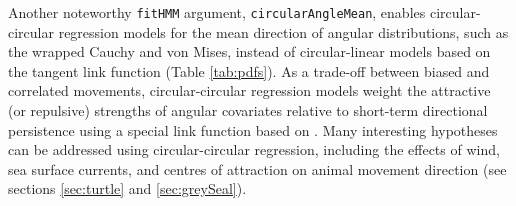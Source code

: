 \documentclass[12pt]{article}\usepackage[]{graphicx}\usepackage[]{color}
\begin{document}
Another noteworthy \verb|fitHMM| argument, \verb|circularAngleMean|, enables circular-circular regression models for the mean direction of angular distributions, such as the wrapped Cauchy and von Mises, instead of circular-linear models based on the tangent link function (Table \ref{tab:pdfs}). %
As a trade-off between biased and correlated movements, circular-circular regression models weight the attractive (or repulsive) strengths of angular covariates relative to short-term directional persistence using a special link function based on \cite{DuchesneEtAl2015}. Many interesting hypotheses can be addressed using circular-circular regression, including the effects of wind, sea surface currents, and centres of attraction on animal movement direction (see sections \ref{sec:turtle} and \ref{sec:greySeal}). 
\end{document}

